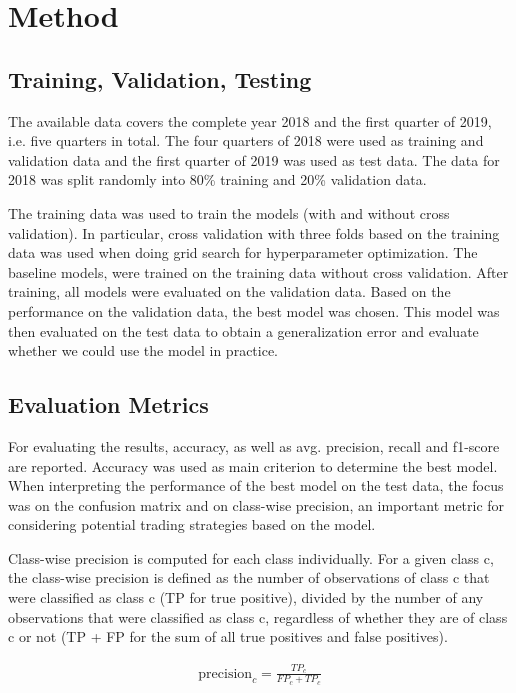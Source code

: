 \documentclass{article}
\begin{document}
	\section{Method}
	
	\subsection{Training, Validation, Testing}
	
	The available data covers the complete year 2018 and the first quarter of 2019, i.e. five quarters in total. The four quarters of 2018 were used as training and validation data and the first quarter of 2019 was used as test data. The data for 2018 was split randomly into 80\% training and 20\% validation data. 
	
	The training data was used to train the models (with and without cross validation). In particular, cross validation with three folds based on the training data was used when doing grid search for hyperparameter optimization. The baseline models, were trained on the training data without cross validation. After training, all models were evaluated on the validation data. Based on the performance on the validation data, the best model was chosen. This model was then evaluated on the test data to obtain a generalization error and evaluate whether we could use the model in practice. 
	
	\subsection{Evaluation Metrics}
	
	For evaluating the results, accuracy, as well as avg. precision, recall and f1-score are reported. Accuracy was used as main criterion to determine the best model. When interpreting the performance of the best model on the test data, the focus was on the confusion matrix and on class-wise precision, an important metric for considering potential trading strategies based on the model.
	
	Class-wise precision is computed for each class individually. For a given class c, the class-wise precision is defined as the number of observations of class c that were classified as class c (TP for true positive), divided by the number of any observations that were classified as class c, regardless of whether they are of class c or not (TP + FP for the sum of all true positives and false positives).
	
	\begin{align}
	\mathrm{precision}_c = \frac{TP_c}{FP_c + TP_c}
	\end{align}
	
\end{document}
